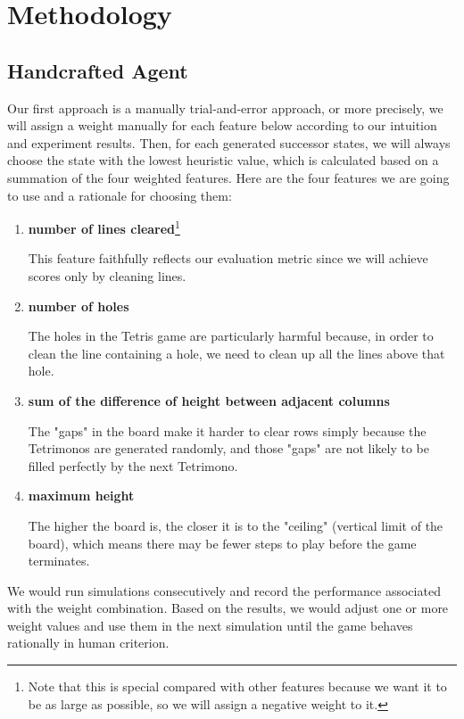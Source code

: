 \documentclass[letterpaper]{article} %
\begin{document}

\section{Methodology}

\subsection{Handcrafted Agent}
Our first approach is a manually trial-and-error approach, or more precisely, we will assign a weight manually for each feature below according to our intuition and experiment results. Then, for each generated successor states, we will always choose the state with the lowest heuristic value, which is calculated based on a summation of the four weighted features. Here are the four features we are going to use and a rationale for choosing them:
\begin{enumerate}
 \item {\bf number of lines cleared}\footnote{Note that this is special compared with other features because we want it to be as large as possible, so we will assign a negative weight to it.}

This feature faithfully reflects our evaluation metric since we will achieve scores only by cleaning lines.

 \item {\bf number of holes}

The holes in the Tetris game are particularly harmful because, in order to clean the line containing a hole, we need to clean up all the lines above that hole. 

 \item {\bf sum of the difference of height between adjacent columns}

The "gaps" in the board make it harder to clear rows simply because the Tetrimonos are generated randomly, and those "gaps" are not likely to be filled perfectly by the next Tetrimono.

 \item {\bf maximum height}

The higher the board is, the closer it is to the "ceiling" (vertical limit of the board), which means there may be fewer steps to play before the game terminates.

\end{enumerate}

We would run simulations consecutively and record the performance associated with the weight combination. Based on the results, we would adjust one or more weight values and use them in the next simulation until the game behaves rationally in human criterion.
\end{document}
